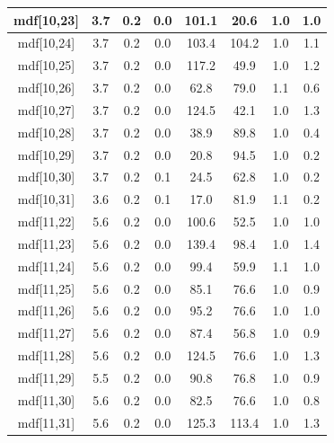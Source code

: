 \begin{longtable}{|c|c|c|c|c|c|c|c|}
\hline
mdf[10,23] & 3.7 & 0.2 & 0.0 & 101.1 & 20.6 & 1.0 & 1.0 \\
\hline
mdf[10,24] & 3.7 & 0.2 & 0.0 & 103.4 & 104.2 & 1.0 & 1.1 \\
\hline
mdf[10,25] & 3.7 & 0.2 & 0.0 & 117.2 & 49.9 & 1.0 & 1.2 \\
\hline
mdf[10,26] & 3.7 & 0.2 & 0.0 & 62.8 & 79.0 & 1.1 & 0.6 \\
\hline
mdf[10,27] & 3.7 & 0.2 & 0.0 & 124.5 & 42.1 & 1.0 & 1.3 \\
\hline
mdf[10,28] & 3.7 & 0.2 & 0.0 & 38.9 & 89.8 & 1.0 & 0.4 \\
\hline
mdf[10,29] & 3.7 & 0.2 & 0.0 & 20.8 & 94.5 & 1.0 & 0.2 \\
\hline
mdf[10,30] & 3.7 & 0.2 & 0.1 & 24.5 & 62.8 & 1.0 & 0.2 \\
\hline
mdf[10,31] & 3.6 & 0.2 & 0.1 & 17.0 & 81.9 & 1.1 & 0.2 \\
\hline
mdf[11,22] & 5.6 & 0.2 & 0.0 & 100.6 & 52.5 & 1.0 & 1.0 \\
\hline
mdf[11,23] & 5.6 & 0.2 & 0.0 & 139.4 & 98.4 & 1.0 & 1.4 \\
\hline
mdf[11,24] & 5.6 & 0.2 & 0.0 & 99.4 & 59.9 & 1.1 & 1.0 \\
\hline
mdf[11,25] & 5.6 & 0.2 & 0.0 & 85.1 & 76.6 & 1.0 & 0.9 \\
\hline
mdf[11,26] & 5.6 & 0.2 & 0.0 & 95.2 & 76.6 & 1.0 & 1.0 \\
\hline
mdf[11,27] & 5.6 & 0.2 & 0.0 & 87.4 & 56.8 & 1.0 & 0.9 \\
\hline
mdf[11,28] & 5.6 & 0.2 & 0.0 & 124.5 & 76.6 & 1.0 & 1.3 \\
\hline
mdf[11,29] & 5.5 & 0.2 & 0.0 & 90.8 & 76.8 & 1.0 & 0.9 \\
\hline
mdf[11,30] & 5.6 & 0.2 & 0.0 & 82.5 & 76.6 & 1.0 & 0.8 \\
\hline
mdf[11,31] & 5.6 & 0.2 & 0.0 & 125.3 & 113.4 & 1.0 & 1.3 \\
\hline
\end{longtable}
